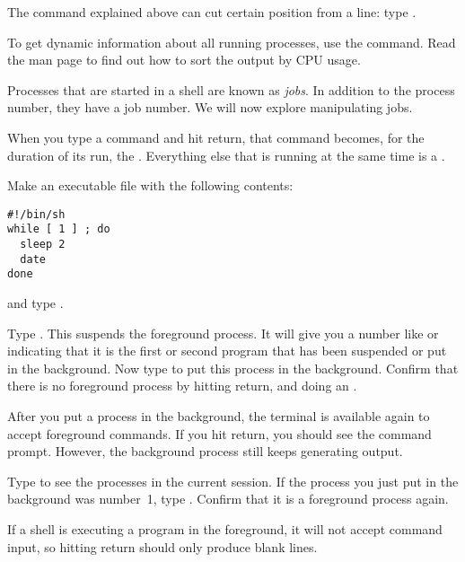 The  command
explained above can
cut certain position from a line: type .

To get dynamic information about all running processes, use the
 command. Read the man page to find out how to sort the output
by CPU usage.

Processes that are started in a shell are known as
\emph{jobs}.
In addition to the process number, they have a job number.
We will now explore manipulating jobs.

When you type a command and hit return, that command becomes, for
the duration of its run, the .
Everything else that is running at the same time is a
.

Make an executable file  with the following contents:
\begin{verbatim}
#!/bin/sh
while [ 1 ] ; do
  sleep 2
  date
done
\end{verbatim}
and type . 

\begin{exercise}
  Type . This suspends the foreground process. It will
  give you a number like \n{[1]} or \n{[2]} indicating that it is the
  first or second program that has been suspended or put in the
  background. Now type  to put this process in the
  background. Confirm that there is no foreground process by hitting
  return, and doing an .
\end{exercise}
\begin{outcome}
  After you put a process in the background, the terminal is available
  again to accept foreground commands. If you hit return, you should
  see the command prompt. However, the background process still keeps
  generating output.
\end{outcome}

\begin{exercise}
  Type  to see the processes in the current session. If the
  process you just put in the background was number~1,
  type . Confirm that it is a foreground process again.
\end{exercise}
\begin{outcome}
  If a shell is executing a program in the foreground, it will not
  accept command input, so hitting return should only produce blank
  lines.
\end{outcome}

